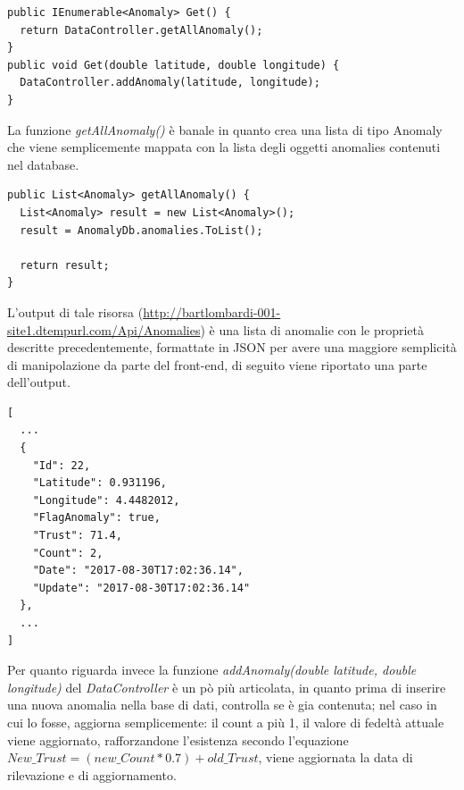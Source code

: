 \documentclass[a4paper, 11pt]{article} %
\begin{document}
\begin{lstlisting}
public IEnumerable<Anomaly> Get() { 
  return DataController.getAllAnomaly(); 
}
public void Get(double latitude, double longitude) {
  DataController.addAnomaly(latitude, longitude);
}
\end{lstlisting}
La funzione \textit{getAllAnomaly()} è banale in quanto crea una lista di tipo Anomaly che viene semplicemente mappata con la lista degli oggetti anomalies contenuti nel database.

\begin{lstlisting}
public List<Anomaly> getAllAnomaly() {   
  List<Anomaly> result = new List<Anomaly>();
  result = AnomalyDb.anomalies.ToList();

  return result;
}
\end{lstlisting}
L'output di tale risorsa (\url{http://bartlombardi-001-site1.dtempurl.com/Api/Anomalies}) è una lista di anomalie con le proprietà descritte precedentemente, formattate in JSON per avere una maggiore semplicità di manipolazione da parte del front-end, di seguito viene riportato una parte dell'output.
\begin{verbatim}
[
  ...
  {
    "Id": 22,
    "Latitude": 0.931196,
    "Longitude": 4.4482012,
    "FlagAnomaly": true,
    "Trust": 71.4,
    "Count": 2,
    "Date": "2017-08-30T17:02:36.14",
    "Update": "2017-08-30T17:02:36.14"
  },
  ...
]
\end{verbatim}
Per quanto riguarda invece la funzione \textit{addAnomaly(double latitude, double longitude)} del \textit{DataController} è un pò più articolata, in quanto prima di inserire una nuova anomalia nella base di dati, controlla se è gia contenuta; nel caso in cui lo fosse, aggiorna semplicemente: il count a più 1, il valore di fedeltà attuale viene aggiornato, rafforzandone l'esistenza secondo l'equazione $New\_Trust = (new\_Count * 0.7) + old\_Trust$, viene aggiornata la data di rilevazione e di aggiornamento. 
\end{document}
